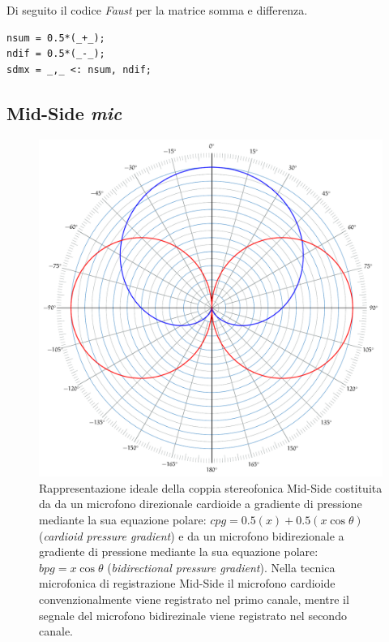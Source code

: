 Di seguito il codice \emph{Faust} per la matrice somma e differenza.

\begin{lstlisting}
nsum = 0.5*(_+_);
ndif = 0.5*(_-_);
sdmx = _,_ <: nsum, ndif;
\end{lstlisting}

\subsection{Mid-Side \emph{mic}}
\label{subsec:msmic}

\begin{figure}[h]
\centering
\includegraphics[width=1\columnwidth]{CAPITOLI/_TIKZ/POLAR/midside}
\caption{Rappresentazione ideale della coppia stereofonica Mid-Side costituita da
da un microfono direzionale cardioide a gradiente di pressione mediante la sua
equazione polare: $cpg = 0.5(x) + 0.5(x\cos\theta)$ (\emph{cardioid pressure
gradient}) e da un microfono bidirezionale a gradiente di
pressione mediante la sua equazione polare: $bpg = x\cos\theta$
(\emph{bidirectional pressure gradient}). Nella tecnica microfonica di registrazione
Mid-Side il microfono cardioide convenzionalmente viene registrato nel primo canale,
mentre il segnale del microfono bidirezinale viene registrato nel secondo canale.}
\label{polar:midsidemic}
\end{figure}

